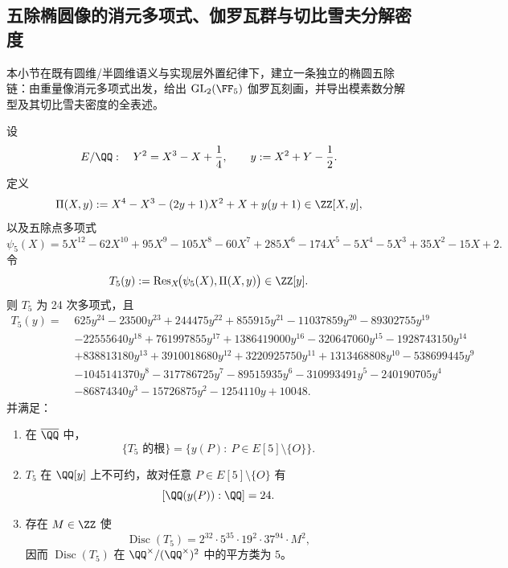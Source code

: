 \subsection{五除椭圆像的消元多项式、伽罗瓦群与切比雪夫分解密度}\label{subsec:conclusion-elliptic-five-division-chebotarev-density}
本小节在既有圆维/半圆维语义与实现层外置纪律下，建立一条独立的椭圆五除链：由重量像消元多项式出发，给出 \(\mathrm{GL}_2(\FF_5)\) 伽罗瓦刻画，并导出模素数分解型及其切比雪夫密度的全表述。

\begin{theorem}\label{thm:conclusion-elliptic-t5-elimination-discriminant-squareclass}
设
\[
E/\QQ:\quad Y^2=X^3-X+\frac14,
\qquad
y:=X^2+Y-\frac12.
\]
定义
\[
\Pi(X,y):=X^4-X^3-(2y+1)X^2+X+y(y+1)\in\ZZ[X,y],
\]
以及五除点多项式
\[
\psi_5(X)=5X^{12}-62X^{10}+95X^9-105X^8-60X^7+285X^6-174X^5-5X^4-5X^3+35X^2-15X+2.
\]
令
\[
T_5(y):=\operatorname{Res}_X\!\bigl(\psi_5(X),\Pi(X,y)\bigr)\in\ZZ[y].
\]
则 \(T_5\) 为 24 次多项式，且
\[
\begin{aligned}
T_5(y)=\;&625 y^{24}-23500 y^{23}+244475 y^{22}+855915 y^{21}-11037859 y^{20}-89302755 y^{19}\\
&-22555640 y^{18}+761997855 y^{17}+1386419000 y^{16}-320647060 y^{15}-1928743150 y^{14}\\
&+838813180 y^{13}+3910018680 y^{12}+3220925750 y^{11}+1313468808 y^{10}-538699445 y^9\\
&-1045141370 y^8-317786725 y^7-89515935 y^6-310993491 y^5-240190705 y^4\\
&-86874340 y^3-15726875 y^2-1254110 y+10048.
\end{aligned}
\]
并满足：
\begin{enumerate}
  \item 在 \(\overline{\QQ}\) 中，
  \[
  \{\text{\(T_5\) 的根}\}
  =
  \{y(P):\ P\in E[5]\setminus\{O\}\}.
  \]
  \item \(T_5\) 在 \(\QQ[y]\) 上不可约，故对任意 \(P\in E[5]\setminus\{O\}\) 有
  \[
  [\QQ(y(P)):\QQ]=24.
  \]
  \item 存在 \(M\in\ZZ\) 使
  \[
  \operatorname{Disc}(T_5)=2^{32}\cdot 5^{35}\cdot 19^2\cdot 37^{94}\cdot M^2,
  \]
  因而 \(\operatorname{Disc}(T_5)\) 在 \(\QQ^\times/(\QQ^\times)^2\) 中的平方类为 \(5\)。
\end{enumerate}
\end{theorem}
